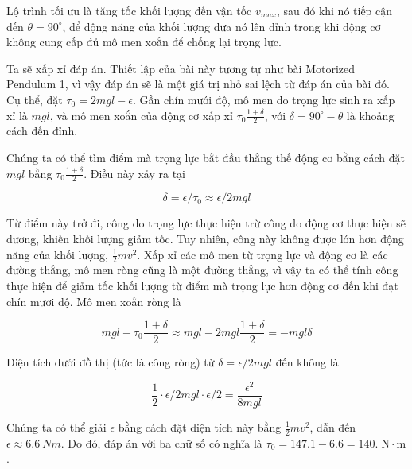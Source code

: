 \begin{solution}
    Lộ trình tối ưu là tăng tốc khối lượng đến vận tốc $v_{max}$, sau đó khi nó tiếp cận đến $\theta=90^{\circ}$, để động năng của khối lượng đưa nó lên đỉnh trong khi động cơ không cung cấp đủ mô men xoắn để chống lại trọng lực. 

    Ta sẽ xấp xỉ đáp án. Thiết lập của bài này tương tự như bài Motorized Pendulum 1, vì vậy đáp án sẽ là một giá trị nhỏ sai lệch từ đáp án của bài đó. Cụ thể, đặt $\tau_0 = 2mgl-\epsilon $. Gần chín mưới độ, mô men do trọng lực sinh ra xấp xỉ là $mgl$, và mô men xoắn của động cơ xấp xỉ $\tau_0 \frac{1+\delta}{2}$, với $\delta=90^{\circ} - \theta$ là khoảng cách đến đỉnh.

   Chúng ta có thể tìm điểm mà trọng lực bắt đầu thắng thế động cơ bằng cách đặt $mgl$ bằng $\tau_0 \frac{1+\delta}{2}$. Điều này xảy ra tại
    
    $$\delta=\epsilon/\tau_0 \approx \epsilon/2mgl$$
    
   Từ điểm này trở đi, công do trọng lực thực hiện trừ công do động cơ thực hiện sẽ dương, khiến khối lượng giảm tốc. Tuy nhiên, công này không được lớn hơn động năng của khối lượng, $\frac{1}{2}mv^2$. Xấp xỉ các mô men từ trọng lực và động cơ là các đường thẳng, mô men ròng cũng là một đường thẳng, vì vậy ta có thể tính công thực hiện để giảm tốc khối lượng từ điểm mà trọng lực hơn động cơ đến khi đạt chín mươi độ. Mô men xoắn ròng là 

    $$mgl-\tau_0 \frac{1+\delta}{2}\approx mgl-2mgl \frac{1+\delta}{2}=-mgl \delta $$

    Diện tích dưới đồ thị (tức là công ròng) từ $\delta=\epsilon/2mgl$ đến không là 

    $$\frac{1}{2} \cdot \epsilon/2mgl \cdot \epsilon/2 = \frac{\epsilon^2}{8mgl} $$

   Chúng ta có thể giải $\epsilon$ bằng cách đặt diện tích này bằng $\frac{1}{2} mv^2$, dẫn đến $\epsilon\approx6.6\ Nm$. Do đó, đáp án với ba chữ số có nghĩa là $\boxed{\tau_0=147.1-6.6=140. \;\mathrm{N\cdot m}}$.
    

\end{solution}